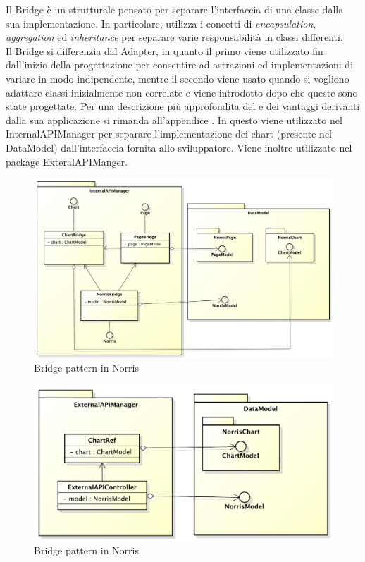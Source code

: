 			Il Bridge è un  strutturale pensato per separare l'interfaccia di una classe dalla sua implementazione. In particolare, utilizza i concetti di \textit{encapsulation}, \textit{aggregation} ed \textit{inheritance} per separare varie responsabilità in classi differenti. \\
			Il  Bridge si differenzia dal  Adapter, in quanto il primo viene utilizzato fin dall'inizio della progettazione per consentire ad astrazioni ed implementazioni di variare in modo indipendente, mentre il secondo viene usato quando si vogliono adattare classi inizialmente non correlate e viene introdotto dopo che queste sono state progettate.
			Per una descrizione più approfondita del  e dei vantaggi derivanti dalla sua applicazione si rimanda all'appendice .
				In  questo  viene utilizzato nel  InternalAPIManager per separare l'implementazione dei chart (presente nel  DataModel) dall'interfaccia fornita allo sviluppatore. Viene inoltre utilizzato nel package ExteralAPIManger.
				\begin{figure}[H]\centering
	        		\includegraphics[width=\textwidth]{SpecificaTecnica/Pics/DesignPatternNorris/Bridge1}
	        		\caption{Bridge pattern in Norris}
	    		\end{figure}
	    		\begin{figure}[H]\centering
	        		\includegraphics[width=\textwidth]{SpecificaTecnica/Pics/DesignPatternNorris/Bridge2}
	        		\caption{Bridge pattern in Norris}
	    		\end{figure}	
				
